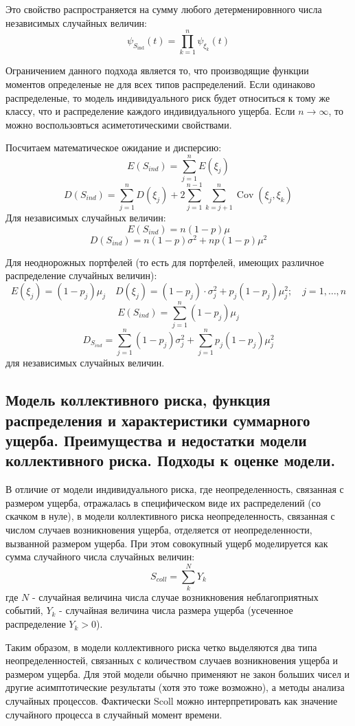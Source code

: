 \documentclass[%
12pt, %
final, %
oneside, %
onecolumn, %
centertags]{article} %
\theoremstyle{plain}
\theoremstyle{definition}
\theoremstyle{remark}
\begin{document}
Это свойство распространяется на сумму любого детерменировнного числа независимых случайных величин:
$$\psi_{S_{\operatorname{ind}}}(t) = \prod\limits_{k=1}^n \psi_{\xi_k}(t)$$

Ограничением данного подхода является то, что производящие функции моментов определеные не для всех типов распределений. Если одинаково распределеные, то модель индивидуального риск будет относиться к тому же классу, что и распределение каждого индивидуального ущерба. Если $n \to \infty$, то можно воспользовться асиметотическими свойствами.

Посчитаем математическое ожидание и дисперсию:
$$E(S_{ind}) = \sum\limits_{j=1}^n E(\xi_j)$$
$$D(S_{ind}) = \sum\limits_{j=1}^n D(\xi_j) + 2 \sum\limits_{j=1}^{n-1}\sum\limits_{k=j+1}^n \operatorname{Cov}(\xi_j, \xi_k)$$
Для независимых случайных величин:
$$E(S_{ind}) = n(1-p)\mu$$
$$D(S_{ind}) = n(1-p)\sigma^2 + np(1-p)\mu^2$$

Для неоднорожных портфелей (то есть для портфелей, имеющих различное распределение случайных величин):
$$E(\xi_j) = (1-p_j)\mu_j \quad D(\xi_j) = (1-p_j) \cdot \sigma_j^2 + p_j (1-p_j)\mu_j^2; \quad  j = 1, \ldots, n$$
$$E(S_{ind}) = \sum\limits_{j=1}^n (1-p_j)\mu_j$$
$$D_{S_{ind}} = \sum\limits_{j=1}^n (1-p_j)\sigma_j^2 + \sum\limits_{j=1}^n p_j(1-p_j)\mu_j^2$$
для независимых случайных величин.

\subsection{Модель коллективного риска, функция распределения и характеристики суммарного ущерба. Преимущества и недостатки модели коллективного риска. Подходы к оценке модели.}

В отличие от модели индивидуального риска, где неопределенность, связанная
с размером ущерба, отражалась в специфическом виде их распределений (со скачком в нуле), в модели коллективного риска неопределенность, связанная с числом
случаев возникновения ущерба, отделяется от неопределенности, вызванной размером ущерба. При этом совокупный ущерб моделируется как сумма случайного числа
случайных величин:
$$S_{coll} = \sum\limits_k^N Y_k$$
где $N$ - случайная величина числа случае возникновения неблагоприятных событий, $Y_k$ - случайная величина числа размера ущерба (усеченное распределение $Y_k >0$).

Таким образом, в модели коллективного риска четко выделяются два типа
неопределенностей, связанных с количеством случаев возникновения ущерба и размером ущерба. Для этой модели обычно применяют не закон больших чисел и другие
асимптотические результаты (хотя это тоже возможно), а методы анализа случайных процессов. Фактически Scoll можно интерпретировать как значение случайного
процесса в случайный момент времени.
\end{document}
